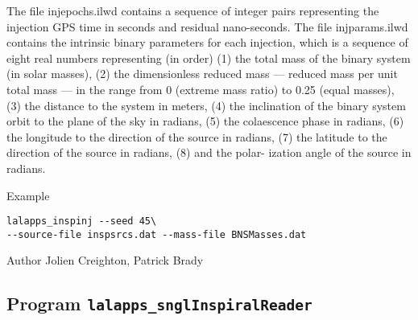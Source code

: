 \begin{entry}
\begin{entry}
The  file  injepochs.ilwd  contains  a sequence of integer pairs representing
the injection GPS time in  seconds  and residual  nano-seconds.   The file
injparams.ilwd contains the intrinsic binary parameters for each injection,
which is  a  sequence  of  eight  real  numbers representing (in order) (1) the
total mass of the binary system  (in  solar masses),  (2)  the  dimensionless
reduced mass --- reduced mass per unit total mass --- in the range from  0
(extreme mass  ratio)  to  0.25 (equal masses), (3) the distance to the system
in meters, (4) the inclination  of  the  binary system  orbit  to the plane of
the sky in radians, (5) the colaescence phase in radians, (6)  the  longitude
to  the direction  of  the  source in radians, (7) the latitude to the
direction of the source in radians, (8) and the polar- ization angle of the
source in radians.
\end{entry}

\item[Example]
\begin{verbatim}
lalapps_inspinj --seed 45\
--source-file inspsrcs.dat --mass-file BNSMasses.dat
\end{verbatim}

\item[Author] 
Jolien Creighton, Patrick Brady
\end{entry}

%
% 
\clearpage
\subsection{Program \texttt{lalapps\_snglInspiralReader}}
\label{program:lalapps-snglInspiralReader}

